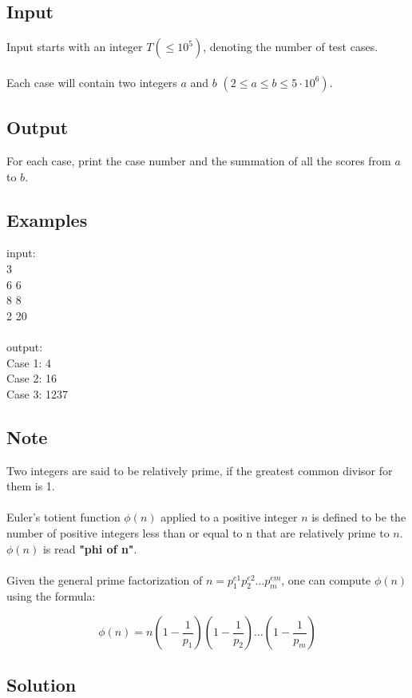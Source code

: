 \documentclass[10pt,a4paper]{article}
\begin{document}
\begin{itemize}
\subsection*{Input}
Input starts with an integer $T (\leq 10^5)$, denoting the number of test cases.
\\ \\
Each case will contain two integers $a$ and $b$ $(2 \leq a \leq b \leq 5 \cdot 10^6)$.
\subsection*{Output}
For each case, print the case number and the summation of all the scores from $a$ to $b$.

\subsection*{Examples}
input: \\
3 \\
6 6 \\
8 8 \\
2 20 
\\ \\
output: \\
Case 1: 4 \\
Case 2: 16 \\
Case 3: 1237 

\subsection*{Note}
Two integers are said to be relatively prime, if the greatest common divisor for them is 1.
\\ \\
Euler's totient function  $\phi (n)$ applied to a positive integer $n$ is defined to be the number of positive integers less than or equal to n that are relatively prime to $n$. $\phi (n)$ is read \textbf{"phi of n"}.
\\ \\
Given the general prime factorization of $n = p_1^{e1} p_2^{e2} …p_m^{em}$, one can compute  $\phi (n)$ using the formula:

$$\phi (n)=n \left(1 - \frac{1}{p_1}\right)\left(1 - \frac{1}{p_2}\right)…\left(1 - \frac{1}{p_m}\right)$$

\subsection*{Solution}


\end{itemize}
\end{document}
